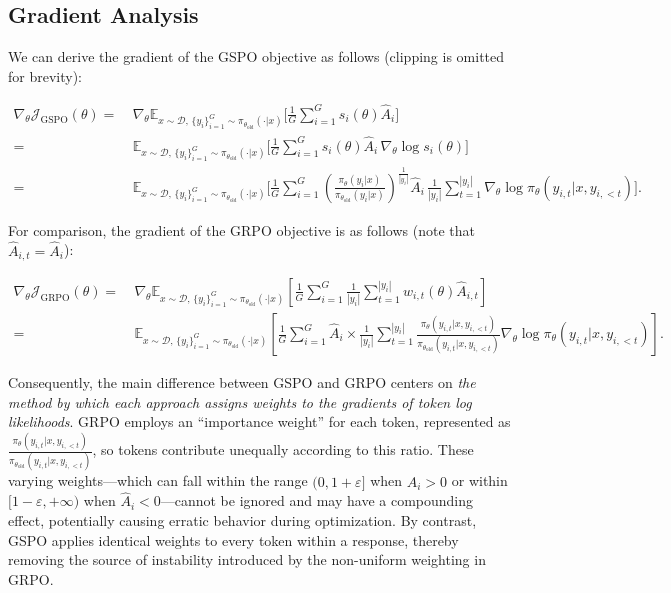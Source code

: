 \subsection{Gradient Analysis}
\label{subsec:gradient}

We can derive the gradient of the GSPO objective as follows (clipping is omitted for brevity):

\begin{align}
\nabla_{\theta} \mathcal{J}_\text{GSPO} (\theta)
=&\ 
\nabla_{\theta} \mathbb{E}_{ x \sim \mathcal{D},\, \{y_i\}_{i=1}^G \sim \pi_{\theta_\text{old}}( \cdot | x) }
\Bigg[ 
\frac{1}{G} \sum_{i=1}^{G} s_{i}(\theta) \widehat{A}_{i}
\Bigg] \\
= &\ 
\mathbb{E}_{ x \sim \mathcal{D},\, \{y_i\}_{i=1}^G \sim \pi_{\theta_\text{old}}( \cdot | x) }
\Bigg[ 
\frac{1}{G} \sum_{i=1}^{G}
s_{i}(\theta) \widehat{A}_{i}
\, \nabla_{\theta} \log s_{i}(\theta)
\Bigg] \\
=&\ 
\mathbb{E}_{ x \sim \mathcal{D},\, \{y_i\}_{i=1}^G \sim \pi_{\theta_\text{old}}( \cdot | x) }
\Bigg[ 
\frac{1}{G} \sum_{i=1}^{G} 
\left( \frac{ \pi_{\theta} (y_i | x) }{ \pi_{\theta_\text{old}} (y_i | x)} \right)^{\frac{1}{|y_i|}} \widehat{A}_{i} 
\, \frac{1}{|y_i|} \sum_{t=1}^{|y_i|} \nabla_{\theta} \log \pi_{\theta} (y_{i,t} | x, y_{i,<t}) 
\Bigg].
\label{equ:gspo_grad}
\end{align}

For comparison, the gradient of the GRPO objective is as follows (note that $\widehat{A}_{i,t} = \widehat{A}_{i}$):

\begin{align}
\nabla_{\theta} \mathcal{J}_\text{GRPO} (\theta) 
=&\ 
\nabla_{\theta} \mathbb{E}_{ x \sim \mathcal{D},\, \{y_i\}_{i=1}^G \sim \pi_{\theta_\text{old}}( \cdot | x) }
\left[ \frac{1}{G} \sum_{i=1}^{G} \frac{1}{|y_i|} \sum_{t=1}^{|y_i|} 
w_{i,t}(\theta) \widehat{A}_{i,t}
\right] \\
=&\
\mathbb{E}_{ x \sim \mathcal{D},\, \{y_i\}_{i=1}^G \sim \pi_{\theta_\text{old}}( \cdot | x) }
\left[ \frac{1}{G} \sum_{i=1}^{G} \widehat{A}_{i} 
\times \frac{1}{|y_i|} \sum_{t=1}^{|y_i|} 
\frac{ \pi_{\theta} (y_{i,t} | x, y_{i,<t}) }{ \pi_{\theta_\text{old}} (y_{i,t} | x,y_{i,<t})} 
\nabla_{\theta} \log \pi_{\theta} (y_{i,t} | x, y_{i,<t})  
\right].
\end{align}

Consequently, the main difference between GSPO and GRPO centers on \textit{the method by which each approach assigns weights to the gradients of token log likelihoods}. GRPO employs an ``importance weight'' for each token, represented as $\frac{ \pi_{\theta} (y_{i,t} | x, y_{i,<t}) }{ \pi_{\theta_\text{old}} (y_{i,t} | x,y_{i,<t})}$, so tokens contribute unequally according to this ratio. These varying weights—which can fall within the range $(0, 1+\varepsilon]$ when $\widehat{A}_{i} >0$ or within $[1-\varepsilon, +\infty)$ when $\widehat{A}_{i} < 0$—cannot be ignored and may have a compounding effect, potentially causing erratic behavior during optimization. By contrast, GSPO applies identical weights to every token within a response, thereby removing the source of instability introduced by the non-uniform weighting in GRPO.

